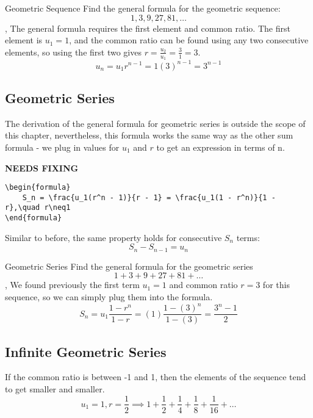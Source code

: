 \documentclass[../../main.tex]{subfiles}
\begin{document}
\begin{example}{Geometric Sequence}
Find the general formula for the geometric sequence:
\[
    1, 3, 9, 27, 81, \ldots
\]
\sep
The general formula requires the first element and common ratio. The first element is \(u_1 = 1\), and the common ratio can be found using any two consecutive elements, so using the first two gives \(r = \frac{u_2}{u_1} = \frac31 = 3\).
\[
    u_n = u_1r^{n-1} = 1(3)^{n-1} = 3^{n-1}
\]
\end{example}

\subsection{Geometric Series}

The derivation of the general formula for geometric series is outside the scope of this chapter, nevertheless, this formula works the same way as the other sum formula - we plug in values for \(u_1\) and \(r\) to get an expression in terms of n.

{\hfill\Large\bfseries NEEDS FIXING\hfill}
\begin{lstlisting}
\begin{formula}
    S_n = \frac{u_1(r^n - 1)}{r - 1} = \frac{u_1(1 - r^n)}{1 - r},\quad r\neq1
\end{formula}
 \end{lstlisting}

Similar to before, the same property holds for consecutive \(S_n\) terms:
\[
    S_n - S_{n - 1} = u_n
\]

\begin{example}{Geometric Series}
Find the general formula for the geometric series
\[
    1 + 3 + 9 + 27 + 81 + \ldots
\]
\sep
We found previously the first term \(u_1 = 1\) and common ratio \(r = 3\) for this sequence, so we can simply plug them into the formula.
\[
    S_n = u_1\frac{1 - r^n}{1 - r} = (1)\frac{1 - (3)^n}{1 - (3)} = \frac{3^n - 1}2
\]
\end{example}

\subsection{Infinite Geometric Series}

If the common ratio is between -1 and 1, then the elements of the sequence tend to get smaller and smaller.
\[
    u_1 = 1, r = \frac12 \implies 1 + \frac12 + \frac14 + \frac18 + \frac1{16} + \ldots
\]
\begin{center}
\end{center}
\end{document}
